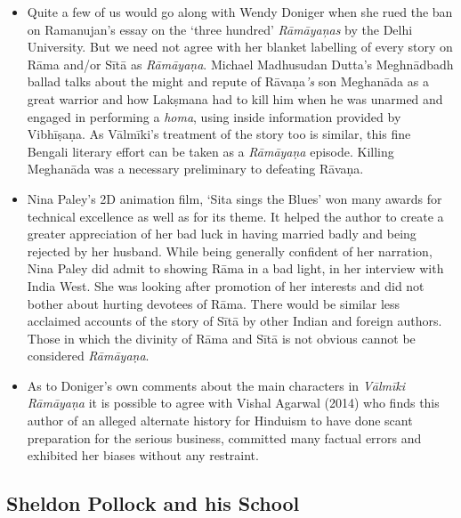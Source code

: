 \begin{itemize}
\item Quite a few of us would go along with Wendy Doniger when she rued the ban on Ramanujan’s essay on the ‘three hundred’ \textit{Rāmāyaņas} by the Delhi University. But we need not agree with her blanket labelling of every story on Rāma and/or Sītā as \textit{Rāmāyaṇa}. Michael Madhusudan Dutta’s Meghnādbadh ballad talks about the might and repute of Rāvaṇa\textit{'s} son Meghanāda as a great warrior and how Lakṣmana had to kill him when he was unarmed and engaged in performing a \textit{homa}, using inside information provided by Vibhīṣaṇa. As Vālmīki’s treatment of the story too is similar, this fine Bengali literary effort can be taken as a \textit{Rāmāyaṇa} episode. Killing Meghanāda was a necessary preliminary to defeating Rāvaṇa.

 \item Nina Paley’s 2D animation film, ‘Sita sings the Blues’ won many awards for technical excellence as well as for its theme. It helped the author to create a greater appreciation of her bad luck in having married badly and being rejected by her husband. While being generally confident of her narration, Nina Paley did admit to showing Rāma in a bad light, in her interview with India West. She was looking after promotion of her interests and did not bother about hurting devotees of Rāma. There would be similar less acclaimed accounts of the story of Sītā by other Indian and foreign authors. Those in which the divinity of Rāma and Sītā is not obvious cannot be considered \textit{Rāmāyaṇa}.

 \item As to Doniger’s own comments about the main characters in \textit{Vālmīki Rāmāyaṇa} it is possible to agree with Vishal Agarwal (2014) who finds this author of an alleged alternate history for Hinduism to have done scant preparation for the serious business, committed many factual errors and exhibited her biases without any restraint.

\end{itemize}


\subsection*{Sheldon Pollock and his School}

